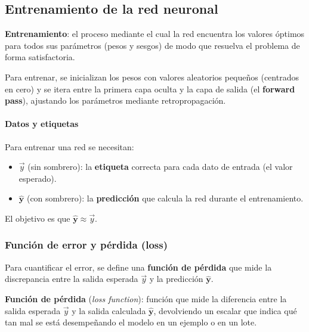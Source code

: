 \subsection{Entrenamiento de la red neuronal}

\begin{definicion}
\textbf{Entrenamiento}: el proceso mediante el cual la red encuentra los valores óptimos para todos sus parámetros (pesos y sesgos) de modo que resuelva el problema de forma satisfactoria.
\end{definicion}

Para entrenar, se inicializan los pesos con valores aleatorios pequeños (centrados en cero) y se itera entre la primera capa oculta y la capa de salida (el \textbf{forward pass}), ajustando los parámetros mediante retropropagación.

\paragraph{Datos y etiquetas}

Para entrenar una red se necesitan:

\begin{itemize}[topsep=2pt,itemsep=1pt]
  \item $\vec{y}$ (sin sombrero): la \textbf{etiqueta} correcta para cada dato de entrada (el valor esperado).
  \item $\hat{\mathbf{y}}$ (con sombrero): la \textbf{predicción} que calcula la red durante el entrenamiento.
\end{itemize}

El objetivo es que $\hat{\mathbf{y}} \approx \vec{y}$.

\subsubsection{Función de error y pérdida (loss)}

Para cuantificar el error, se define una \textbf{función de pérdida} que mide la discrepancia entre la salida esperada $\vec{y}$ y la predicción $\hat{\mathbf{y}}$.

\begin{definicion}
\textbf{Función de pérdida} (\emph{loss function}): función que mide la diferencia entre la salida esperada $\vec{y}$ y la salida calculada $\hat{\mathbf{y}}$, devolviendo un escalar que indica qué tan mal se está desempeñando el modelo en un ejemplo o en un lote.
\end{definicion}

